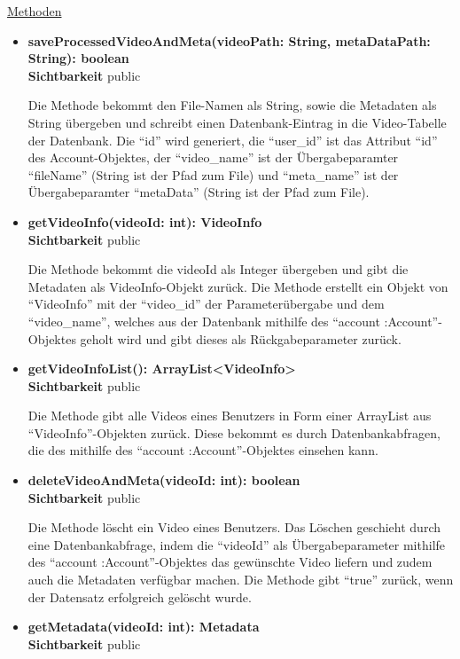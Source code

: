 \underline{Methoden}
\begin{itemize}
\itemsep0pt
\item \textbf{saveProcessedVideoAndMeta(videoPath: String, metaDataPath: String): boolean}\hfill\\
\textbf{Sichtbarkeit} public

Die Methode bekommt den File-Namen als String, sowie die Metadaten als String übergeben und schreibt einen Datenbank-Eintrag in die Video-Tabelle der Datenbank. Die ``id'' wird generiert, die ``user\_id'' ist das Attribut ``id'' des Account-Objektes, der ``video\_name'' ist der Übergabeparamter ``fileName'' (String ist der Pfad zum File) und ``meta\_name'' ist der Übergabeparamter ``metaData'' (String ist der Pfad zum File). 

\item \textbf{getVideoInfo(videoId: int): VideoInfo}\hfill\\
\textbf{Sichtbarkeit} public

Die Methode bekommt die videoId als Integer übergeben und gibt die Metadaten als VideoInfo-Objekt zurück. Die Methode erstellt ein Objekt von ``VideoInfo'' mit der ``video\_id'' der Parameterübergabe und dem ``video\_name'', welches aus der Datenbank mithilfe des ``account :Account''-Objektes geholt wird und gibt dieses als Rückgabeparameter zurück.

\item \textbf{getVideoInfoList(): ArrayList<VideoInfo>}\hfill\\
\textbf{Sichtbarkeit} public

Die Methode gibt alle Videos eines Benutzers in Form einer ArrayList aus ``VideoInfo''-Objekten zurück. Diese bekommt es durch Datenbankabfragen, die des mithilfe des ``account :Account''-Objektes einsehen kann.

\item \textbf{deleteVideoAndMeta(videoId: int): boolean}\hfill\\
\textbf{Sichtbarkeit} public

Die Methode löscht ein Video eines Benutzers. Das Löschen geschieht durch eine Datenbankabfrage, indem die ``videoId'' als Übergabeparameter mithilfe des ``account :Account''-Objektes das gewünschte Video liefern und zudem auch die Metadaten verfügbar machen. Die Methode gibt ``true'' zurück, wenn der Datensatz erfolgreich gelöscht wurde.  

\item \textbf{getMetadata(videoId: int): Metadata}\hfill\\
\textbf{Sichtbarkeit} public


\end{itemize}
